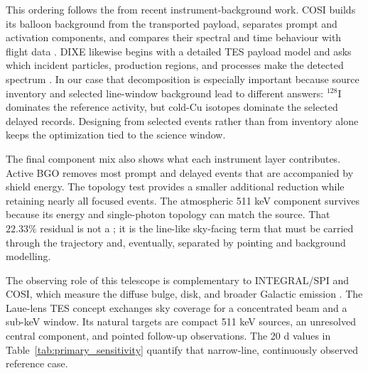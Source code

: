 \documentclass[11pt]{article}
\begin{document}
This ordering follows the  from recent instrument-background work.
COSI builds its balloon background from the transported payload, separates prompt
and activation components, and compares their spectral and time behaviour with
flight data \cite{Gallego2025Balloon}. DIXE likewise begins with a detailed TES
payload model and asks which incident particles, production regions, and processes
make the detected spectrum \cite{Tian2026DIXE}. In our case that decomposition is
especially important because source inventory and selected line-window background
lead to different answers: $^{128}$I dominates the reference activity, but cold-Cu
isotopes dominate the selected delayed records. Designing from selected events
rather than from inventory alone keeps the optimization tied to the science window.

The final component mix also shows what each instrument layer contributes. Active
BGO removes most prompt and delayed events that are accompanied by shield energy.
The topology test provides a smaller additional reduction while retaining nearly
all focused events. The atmospheric 511 keV component survives because its energy
and single-photon topology can match the source. That $22.33\%$ residual is not a
; it is the line-like sky-facing term that must be carried
through the trajectory and, eventually, separated by pointing and background
modelling.

The observing role of this telescope is complementary to INTEGRAL/SPI and COSI,
which measure the diffuse bulge, disk, and broader Galactic emission
\cite{Siegert2016AA,Kierans2020,Siegert2020COSI,Yoneda2025,Karwin2023}.
The Laue-lens TES concept exchanges sky coverage for a concentrated beam and a
sub-keV window. Its natural targets are compact 511 keV sources, an unresolved
central component, and pointed follow-up observations. The 20 d values in
Table~\ref{tab:primary_sensitivity} quantify that narrow-line, continuously
observed reference case.
\end{document}
